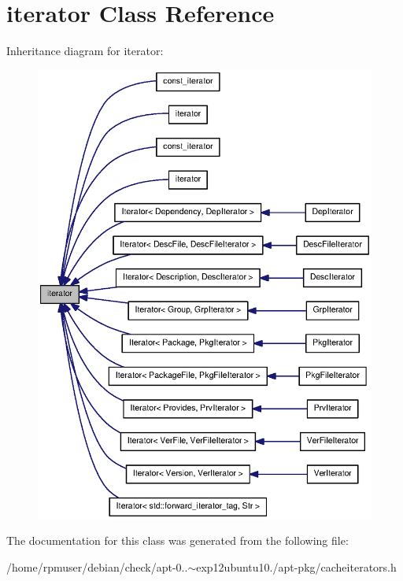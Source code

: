 \section{iterator \-Class \-Reference}
\label{classstd_1_1iterator}


\-Inheritance diagram for iterator\-:
\nopagebreak
\begin{figure}[H]
\begin{center}
\leavevmode
\includegraphics[width=350pt]{classstd_1_1iterator__inherit__graph}
\end{center}
\end{figure}


\-The documentation for this class was generated from the following file\-:\begin{DoxyCompactItemize}
\item 
/home/rpmuser/debian/check/apt-\/0..$\sim$exp12ubuntu10./apt-\/pkg/cacheiterators.\-h\end{DoxyCompactItemize}
